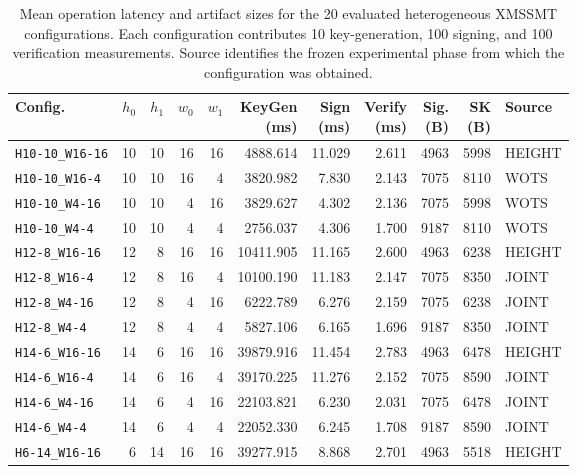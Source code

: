 
\begin{table}[t]
\centering
\caption{Mean operation latency and artifact sizes for the 20 evaluated heterogeneous XMSSMT configurations. Each configuration contributes 10 key-generation, 100 signing, and 100 verification measurements. Source identifies the frozen experimental phase from which the configuration was obtained.}
\label{tab:joint-results}
\scriptsize
\setlength{\tabcolsep}{1.2pt}
\begin{tabular}{lrrrrrrrrrl}
\toprule
Config. &
$h_0$ & $h_1$ & $w_0$ & $w_1$ &
\shortstack{KeyGen\\(ms)} &
\shortstack{Sign\\(ms)} &
\shortstack{Verify\\(ms)} &
\shortstack{Sig.\\(B)} &
\shortstack{SK\\(B)} &
Source \\
\midrule
\nolinkurl{H10-10_W16-16} & 10 & 10 & 16 & 16 & 4888.614 & 11.029 & 2.611 & 4963 & 5998 & HEIGHT \\
\nolinkurl{H10-10_W16-4} & 10 & 10 & 16 & 4 & 3820.982 & 7.830 & 2.143 & 7075 & 8110 & WOTS \\
\nolinkurl{H10-10_W4-16} & 10 & 10 & 4 & 16 & 3829.627 & 4.302 & 2.136 & 7075 & 5998 & WOTS \\
\nolinkurl{H10-10_W4-4} & 10 & 10 & 4 & 4 & 2756.037 & 4.306 & 1.700 & 9187 & 8110 & WOTS \\
\nolinkurl{H12-8_W16-16} & 12 & 8 & 16 & 16 & 10411.905 & 11.165 & 2.600 & 4963 & 6238 & HEIGHT \\
\nolinkurl{H12-8_W16-4} & 12 & 8 & 16 & 4 & 10100.190 & 11.183 & 2.147 & 7075 & 8350 & JOINT \\
\nolinkurl{H12-8_W4-16} & 12 & 8 & 4 & 16 & 6222.789 & 6.276 & 2.159 & 7075 & 6238 & JOINT \\
\nolinkurl{H12-8_W4-4} & 12 & 8 & 4 & 4 & 5827.106 & 6.165 & 1.696 & 9187 & 8350 & JOINT \\
\nolinkurl{H14-6_W16-16} & 14 & 6 & 16 & 16 & 39879.916 & 11.454 & 2.783 & 4963 & 6478 & HEIGHT \\
\nolinkurl{H14-6_W16-4} & 14 & 6 & 16 & 4 & 39170.225 & 11.276 & 2.152 & 7075 & 8590 & JOINT \\
\nolinkurl{H14-6_W4-16} & 14 & 6 & 4 & 16 & 22103.821 & 6.230 & 2.031 & 7075 & 6478 & JOINT \\
\nolinkurl{H14-6_W4-4} & 14 & 6 & 4 & 4 & 22052.330 & 6.245 & 1.708 & 9187 & 8590 & JOINT \\
\nolinkurl{H6-14_W16-16} & 6 & 14 & 16 & 16 & 39277.915 & 8.868 & 2.701 & 4963 & 5518 & HEIGHT \\

\end{tabular}
\end{table}
